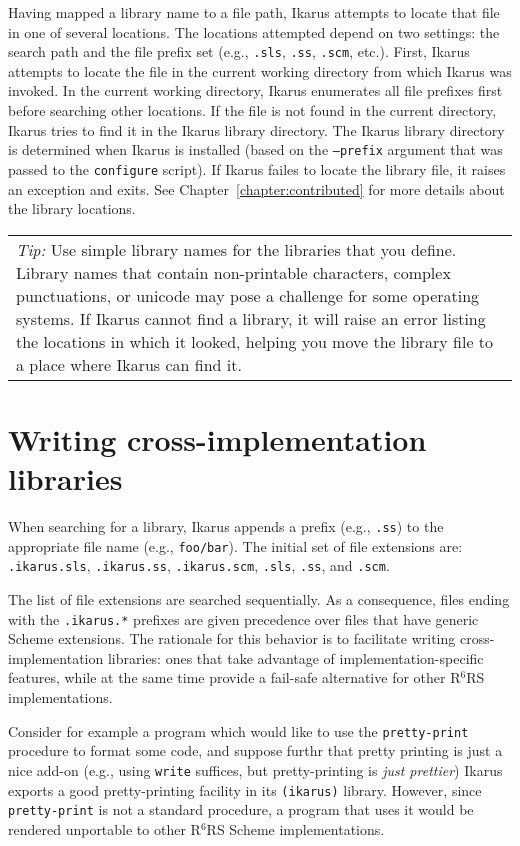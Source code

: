 \documentclass[onecolumn, 12pt, twoside, openright, dvipdfm]{book}
\newcommand{\rnrs}[1]{R$^{\mathrm{#1}}$RS}
\newcommand{\BoxedText}[2]{
  \vspace{.05in}
  \begin{center}
    \begin{tabular}{|p{4.6in}|} {\large \emph{#1}} #2 \end{tabular}
  \end{center}
  \vspace{.05in}
}
\begin{document}
Having mapped a library name to a file path, Ikarus attempts to
locate that file in one of several locations.  The locations
attempted depend on two settings: the search path and the file
prefix set (e.g., \verb|.sls|, \verb|.ss|, \verb|.scm|, etc.).
First, Ikarus attempts to locate the file in the current working
directory from which Ikarus was invoked.  In the current working
directory, Ikarus enumerates all file prefixes first before
searching other locations.  If the file is not found in the current
directory, Ikarus tries to find it in the Ikarus library directory.
The Ikarus library directory is determined when Ikarus is installed
(based on the \texttt{--prefix} argument that was passed to the
\texttt{configure} script).  If Ikarus failes to locate the library
file, it raises an exception and exits.  See
Chapter~\ref{chapter:contributed} for more details about the library
locations.


\BoxedText{Tip:}{Use simple library names for the libraries that
you define.  Library names that contain non-printable characters,
complex punctuations, or unicode may pose a challenge for some
operating systems.  If Ikarus cannot find a library, it will raise
an error listing the locations in which it looked, helping you move
the library file to a place where Ikarus can find it.}

\section{Writing cross-implementation libraries}

When searching for a library, Ikarus appends a prefix (e.g.,
\verb|.ss|) to the appropriate file name (e.g., \verb|foo/bar|).
The initial set of file extensions are: \verb|.ikarus.sls|,
\verb|.ikarus.ss|, \verb|.ikarus.scm|,
\verb|.sls|, \verb|.ss|, and \verb|.scm|.

The list of file extensions are searched sequentially.  As a
consequence, files ending with the \verb|.ikarus.*| prefixes are
given precedence over files that have generic Scheme extensions.
The rationale for this behavior is to facilitate writing
cross-implementation libraries: ones that take advantage of
implementation-specific features, while at the same time 
provide a fail-safe alternative for other \rnrs{6}
implementations.

Consider for example a program which would like to use the
\verb|pretty-print| procedure to format some code, and suppose
furthr that pretty printing is just a nice add-on (e.g., using
\verb|write| suffices, but pretty-printing is \emph{just prettier})
Ikarus exports a good pretty-printing facility in its
\verb|(ikarus)| library.  However, since \verb|pretty-print| is not
a standard procedure, a program that uses it would be rendered
unportable to other \rnrs{6} Scheme implementations.  
\end{document}
